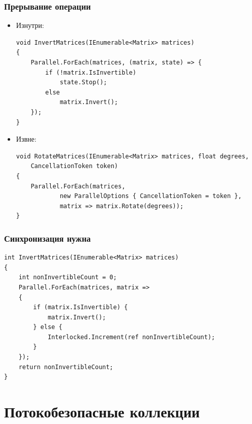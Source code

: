\documentclass{../../slides-style}
\begin{document}
    \begin{frame}[fragile]
        \frametitle{Прерывание операции}
        \begin{itemize}
            \item Изнутри:
            \begin{footnotesize}
                \begin{verbatim}
void InvertMatrices(IEnumerable<Matrix> matrices)
{
    Parallel.ForEach(matrices, (matrix, state) => {
        if (!matrix.IsInvertible)
            state.Stop();
        else
            matrix.Invert();
    });
}
                \end{verbatim}
            \end{footnotesize}

            \item Извне:
            \begin{footnotesize}
                \begin{verbatim}
void RotateMatrices(IEnumerable<Matrix> matrices, float degrees,
    CancellationToken token)
{
    Parallel.ForEach(matrices,
            new ParallelOptions { CancellationToken = token },
            matrix => matrix.Rotate(degrees));
}
                \end{verbatim}
            \end{footnotesize}
        \end{itemize}
    \end{frame}

    \begin{frame}[fragile]
        \frametitle{Синхронизация нужна}
        \begin{footnotesize}
            \begin{verbatim}
int InvertMatrices(IEnumerable<Matrix> matrices)
{
    int nonInvertibleCount = 0;
    Parallel.ForEach(matrices, matrix =>
    {
        if (matrix.IsInvertible) {
            matrix.Invert();
        } else {
            Interlocked.Increment(ref nonInvertibleCount);
        }
    });
    return nonInvertibleCount;
}
            \end{verbatim}
        \end{footnotesize}
    \end{frame}

    \section{Потокобезопасные коллекции}
\end{document}
